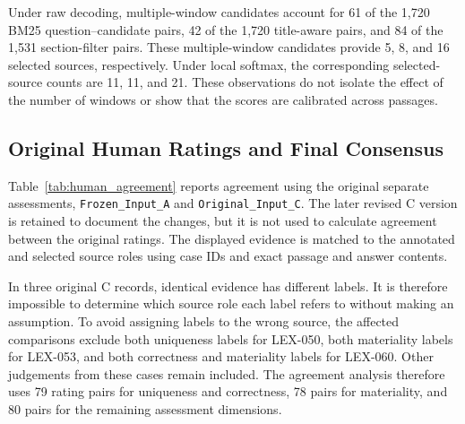 \documentclass[pdflatex,sn-basic]{sn-jnl}%
\theoremstyle{thmstyleone}%
\theoremstyle{thmstyletwo}%
\theoremstyle{thmstylethree}%
\begin{document}
Under raw decoding, multiple-window candidates account for 61 of the 1,720
BM25 question--candidate pairs, 42 of the 1,720 title-aware pairs, and 84 of
the 1,531 section-filter pairs. These multiple-window candidates provide 5,
8, and 16 selected sources, respectively. Under local softmax, the
corresponding selected-source counts are 11, 11, and 21. These observations
do not isolate the effect of the number of windows or show that the scores are
calibrated across passages.

\FloatBarrier

\subsection{Original Human Ratings and Final Consensus}
\label{app:human_agreement}

Table~\ref{tab:human_agreement} reports agreement using the original separate
assessments, \texttt{Frozen\_Input\_A} and \texttt{Original\_Input\_C}. The
later revised C version is retained to document the changes, but it is not used
to calculate agreement between the original ratings. The displayed evidence
is matched to the annotated and selected source roles using case IDs and exact
passage and answer contents.

In three original C records, identical evidence has different labels. It is
therefore impossible to determine which source role each label refers to
without making an assumption. To avoid assigning labels to the wrong source,
the affected comparisons exclude both uniqueness labels for LEX-050, both
materiality labels for LEX-053, and both correctness and materiality labels
for LEX-060. Other judgements from these cases remain included. The agreement
analysis therefore uses 79 rating pairs for uniqueness and correctness, 78
pairs for materiality, and 80 pairs for the remaining assessment dimensions.
\end{document}
